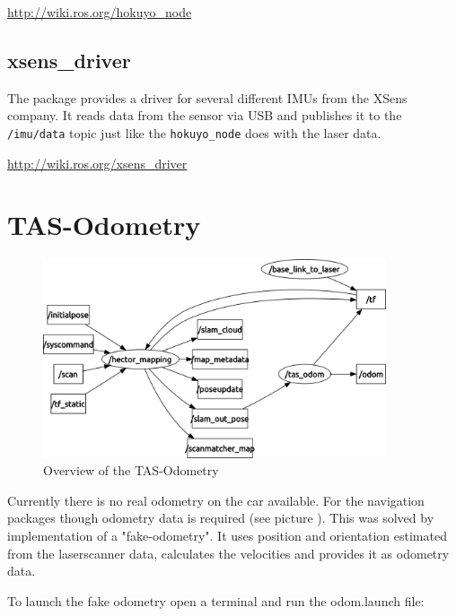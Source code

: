 \hyperref[http://wiki.ros.org/hokuyo_node]{http://wiki.ros.org/hokuyo\_node}

\subsection{xsens\_driver}
\label{sec:tas_package_drivers_xsens}

The package provides a driver for several different IMUs from the XSens company. It reads data from the sensor via USB and publishes it to the \texttt{/imu/data} topic just like the \texttt{hokuyo\_node} does with the laser data.

\hyperref[http://wiki.ros.org/xsens_driver]{http://wiki.ros.org/xsens\_driver}

\newpage
\section{TAS-Odometry}
\label{sec:tas_package_odom}

\begin{figure}[h]
	\centering
		\includegraphics[width=0.9\textwidth]{diagrams/rqt_odom}
	\caption{Overview of the TAS-Odometry}
	\label{fig:rqt_odom}
\end{figure}

Currently there is no real odometry on the car available. For the navigation packages though odometry data is required (see picture ). This was solved by implementation of a "fake-odometry". It uses position and orientation estimated from the laserscanner data, calculates the velocities and provides it as odometry data. 

To launch the fake odometry open a terminal and run the odom.launch file:

 \\

